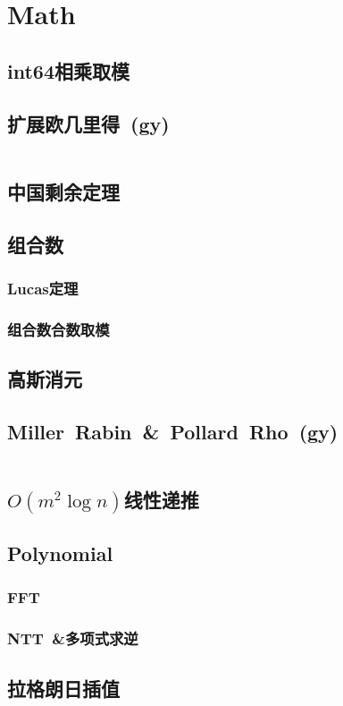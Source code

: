 \chapter{Math}
\section{int64相乘取模}
\section{扩展欧几里得\ \small(gy)}
\inputminted{cpp}{Math/extend_gcd.cpp}
\section{中国剩余定理}
\section{组合数}
\subsection{Lucas定理}
\subsection{组合数合数取模}
\section{高斯消元}
\section{Miller\ Rabin\ \&\ Pollard\ Rho\ \small(gy)}
\inputminted{cpp}{Math/miller_rabin_and_pollard_rho.cpp}
\section{$ O(m ^ 2 \log n) $线性递推}
\section{Polynomial}
\subsection{FFT}
\subsection{NTT\ \&多项式求逆}
\section{拉格朗日插值}
